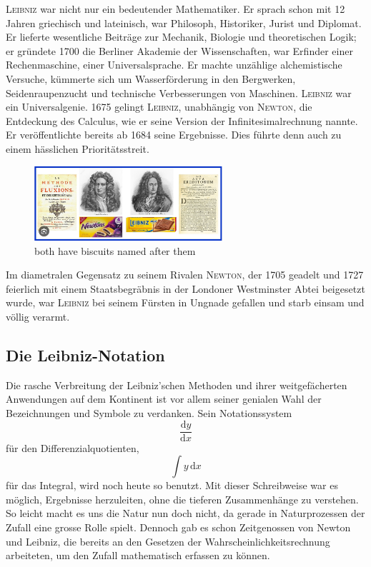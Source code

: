 \documentclass[%
<<<<<<< Updated upstream
11pt,%
twoside,%
titlepage,%
german,%
=======
11pt,%
twoside,%
titlepage,%
swissgerman,%
>>>>>>> Stashed changes
headsepline%
]{scrartcl}
\theoremstyle{definition}
\theoremstyle{plain}
\begin{document}
\textsc{Leibniz} war nicht nur ein bedeutender Mathematiker. Er sprach schon mit 12 Jahren griechisch und lateinisch, war Philosoph, Historiker, Jurist und Diplomat. Er lieferte wesentliche Beiträge zur Mechanik, Biologie und theoretischen Logik; er gründete 1700 die Berliner Akademie der Wissenschaften, war Erfinder einer Rechenmaschine, einer Universalsprache. Er machte unzählige alchemistische Versuche, kümmerte sich um Wasserförderung in den Bergwerken, Seidenraupenzucht und technische Verbesserungen von Maschinen. \textsc{Leibniz} war ein Universalgenie. 1675 gelingt \textsc{Leibniz}, unabhängig von \textsc{Newton}, die Entdeckung des \glqq Calculus\grqq, wie er seine Version der Infinitesimalrechnung nannte. Er veröffentlichte bereits ab 1684 seine Ergebnisse. Dies führte denn auch zu einem hässlichen Prioritätsstreit.
\begin{figure}
    \centering
    \includegraphics[width=0.62\textwidth]{pictures/newton_and_leibiz.jpeg}
    \caption{both have biscuits named after them}
    \label{fig:leibnizandnewton}
\end{figure}
Im diametralen Gegensatz zu seinem Rivalen \textsc{Newton}, der 1705 geadelt und 1727 feierlich mit einem Staatsbegräbnis in der Londoner Westminster Abtei beigesetzt wurde, war \textsc{Leibniz} bei seinem Fürsten in Ungnade gefallen und starb einsam und völlig verarmt.

\subsection{Die Leibniz-Notation}

Die rasche Verbreitung der Leibniz'schen Methoden und ihrer weitgefächerten Anwendungen auf dem Kontinent ist vor allem seiner genialen Wahl der Bezeichnungen und Symbole zu verdanken. Sein Notationssystem
$$\frac{\mathrm{d}y}{\mathrm{d}x}$$
für den Differenzialquotienten,
$$\int y\,\mathrm{d}x$$
für das Integral, wird noch heute so benutzt. Mit dieser Schreibweise war es möglich, Ergebnisse herzuleiten, ohne die tieferen Zusammenhänge zu verstehen.
So leicht macht es uns die Natur nun doch nicht, da gerade in Naturprozessen der Zufall eine grosse Rolle spielt. Dennoch gab es schon Zeitgenossen von Newton und Leibniz, die bereits an den Gesetzen der Wahrscheinlichkeitsrechnung arbeiteten, um den Zufall mathematisch erfassen zu können.
\end{document}
